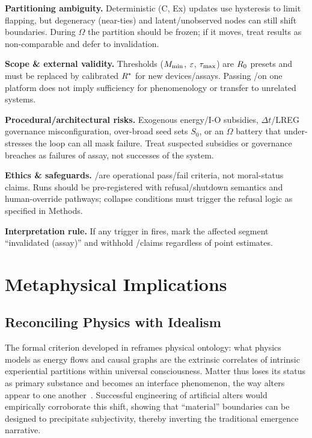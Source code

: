 \documentclass[11pt]{article}
\begin{document}
\textbf{Partitioning ambiguity.} Deterministic (C, Ex) updates use hysteresis to limit flapping, but degeneracy (near-ties) and latent/unobserved nodes can still shift boundaries. During $\Omega$ the partition should be frozen; if it moves, treat results as non-comparable and defer to  invalidation.

\textbf{Scope \& external validity.} Thresholds ($M_{\min}$, $\varepsilon$, $\tau_{\max}$) are $R_0$ presets and must be replaced by calibrated $R^*$ for new devices/assays. Passing \NC/\SC on one platform does not imply sufficiency for phenomenology or transfer to unrelated systems.

\textbf{Procedural/architectural risks.} Exogenous energy/I-O subsidies, $\Delta t$/LREG governance misconfiguration, over-broad seed sets $S_0$, or an $\Omega$ battery that under-stresses the loop can all mask failure. Treat suspected subsidies or governance breaches as failures of assay, not successes of the system.

\textbf{Ethics \& safeguards.} \NC/\SC are operational pass/fail criteria, not moral-status claims. Runs should be pre-registered with refusal/shutdown semantics and human-override pathways; collapse conditions must trigger the refusal logic as specified in Methods.

\textbf{Interpretation rule.} If any trigger in  fires, mark the affected segment ``invalidated (assay)'' and withhold \NC/\SC claims regardless of point estimates.

\section{Metaphysical Implications}
\label{sec:metaphysics}

\subsection{Reconciling Physics with Idealism}

The formal criterion developed in  reframes physical ontology: what physics models as energy flows and causal graphs are the extrinsic correlates of intrinsic experiential partitions within universal consciousness. Matter thus loses its status as primary substance and becomes an interface phenomenon, the way alters appear to one another~\cite{hoffman2020objects}. Successful engineering of artificial alters would empirically corroborate this shift, showing that ``material'' boundaries can be designed to precipitate subjectivity, thereby inverting the traditional emergence narrative.
\end{document}
